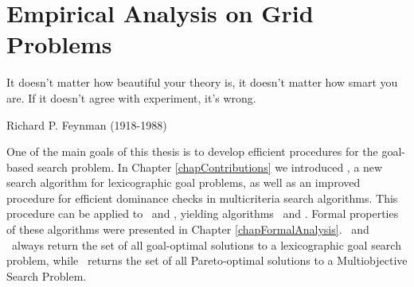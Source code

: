 %
%
%
%
%
%

\chapter{Empirical Analysis on Grid Problems}
\label{chapEmpiricalAnalysisGrids}
%
\begin{FraseCelebre}
\begin{Frase}
It doesn't matter how beautiful your theory is, it doesn't matter how smart you are. If it doesn't agree with experiment, it's wrong.
\end{Frase}
\begin{Fuente}
Richard P. Feynman (1918-1988)
\end{Fuente}
\end{FraseCelebre}
%
%

One of the main goals of this thesis is to develop efficient procedures for the goal-based search problem. In Chapter \ref{chapContributions} we introduced \lexgo, a new search algorithm for lexicographic goal problems, as well as an improved procedure for efficient dominance checks in multicriteria search algorithms. This procedure can be applied to \lexgo \ and \namoa, yielding algorithms \lexgote \ and \namoate. Formal properties of these algorithms were presented in Chapter \ref{chapFormalAnalysis}. \lexgo \ and \lexgote \ always return the set of all goal-optimal solutions to a lexicographic goal search problem, while \namoate \ returns the set of all Pareto-optimal solutions to a Multiobjective Search Problem.

